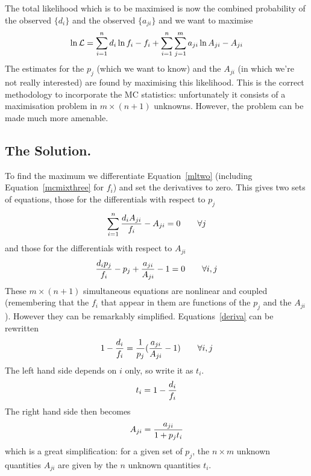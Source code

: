 The total likelihood which is to be maximised is now the combined
probability of the observed $\{d_i\}$ and the observed $\{a_{ji}\}$
and we want to maximise
\begin{equation}
\ln {\cal L} = \sum_{i=1}^n d_i \ln f_i - f_i
+ \sum_{i=1}^n \sum_{j=1}^m a_{ji} \ln A_{ji} - A_{ji}
\label{mltwo}
\end{equation}
The estimates for the $p_j$ (which we want to know) and the
$A_{ji}$ (in which we're not really interested) are found
by maximising this likelihood.   This is the correct methodology
to incorporate the MC statistics: unfortunately it consists
of a maximisation problem in $m \times (n+1)$ unknowns.
However, the problem can be made much more amenable.
 
\subsection*{The Solution.}
 
To find the maximum we differentiate Equation~\ref{mltwo} (including
Equation~\ref{mcmixthree} for $f_i$) and set the
derivatives to zero.   This gives two sets of equations,
those for the differentials with respect to $p_j$
\begin{equation}
\sum_{i=1}^n {d_i A_{ji} \over f_i} - A_{ji}=0\qquad \forall j
\label{derivp}
\end{equation}
and those for the differentials with respect to $A_{ji}$
\begin{equation}
{d_i p_j \over f_i} - p_j
+ {a_{ji} \over A_{ji}} -1
=0\qquad \forall i,j \label{deriva}
\end{equation}
These $m \times (n+1)$ simultaneous equations are
nonlinear and coupled (remembering that the $f_i$ that appear
in them are functions
of the $p_j$ and the $A_{ji}$).  However they can be remarkably simplified.
Equations~\ref{deriva} can be rewritten
\begin{equation}
1-{d_i \over f_i}  ={1 \over p_j}({a_{ji} \over A_{ji}}-1)
\qquad \forall i,j
\label{separate}
\end{equation}
The left hand side depends on $i$ only, so
write it as $t_i$.
\begin{equation}
t_i = 1-{d_i \over f_i} \label{eqt}
\end{equation}
The right hand side then becomes
\begin{equation}
A_{ji} = {a_{ji} \over 1 + p_j t_i} \label{eqalpha}
\end{equation}
which is a great simplification: for a given set of $p_j$,
the $n\times m$ unknown
quantities $A_{ji}$ are given by the $n$ unknown quantities
$t_i$.
 
